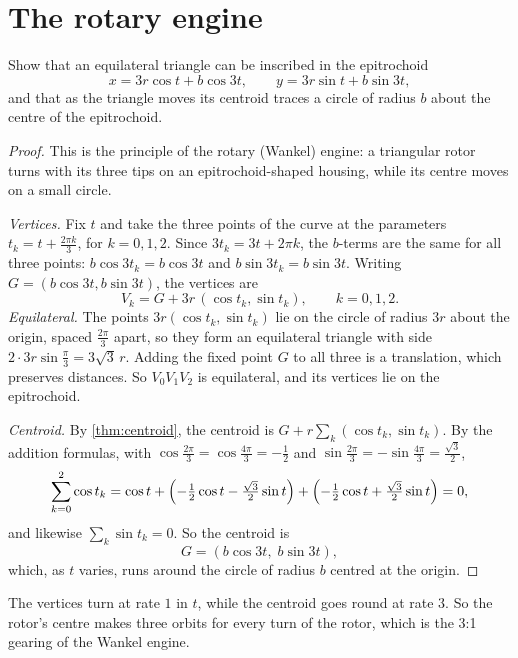 \section{The rotary engine}\label{sec:rotary-engine}



\begin{exercise}\label{ex:epitrochoid}
  Show that an equilateral triangle can be inscribed in the epitrochoid
  \[
    x = 3r\cos t + b\cos 3t, \qquad y = 3r\sin t + b\sin 3t,
  \]
  and that as the triangle moves its centroid traces a circle of radius $b$
  about the centre of the epitrochoid.
\end{exercise}

\begin{proof}
  This is the principle of the rotary (Wankel) engine: a triangular rotor
  turns with its three tips on an epitrochoid-shaped housing, while its
  centre moves on a small circle.

  \emph{Vertices.} Fix $t$ and take the three points of the curve at the
  parameters $t_k = t + \frac{2\pi k}{3}$, for $k = 0, 1, 2$. Since
  $3t_k = 3t + 2\pi k$, the $b$-terms are the same for all three points:
  $b\cos 3t_k = b\cos 3t$ and $b\sin 3t_k = b\sin 3t$. Writing
  $G = (b\cos 3t, b\sin 3t)$, the vertices are
  \[
    V_k = G + 3r\,(\cos t_k, \sin t_k), \qquad k = 0, 1, 2.
  \]
  \emph{Equilateral.} The points $3r(\cos t_k, \sin t_k)$ lie on the circle
  of radius $3r$ about the origin, spaced $\frac{2\pi}{3}$ apart, so they form
  an equilateral triangle with side $2 \cdot 3r \sin\frac{\pi}{3} = 3\sqrt3\,r$.
  Adding the fixed point $G$ to all three is a translation, which preserves
  distances. So $V_0V_1V_2$ is equilateral, and its vertices lie on the
  epitrochoid.

  \emph{Centroid.} By \cref{thm:centroid}, the centroid is
  $G + r\sum_k (\cos t_k, \sin t_k)$. By the addition formulas, with
  $\cos\frac{2\pi}{3} = \cos\frac{4\pi}{3} = -\frac12$ and
  $\sin\frac{2\pi}{3} = -\sin\frac{4\pi}{3} = \frac{\sqrt3}{2}$,
  \[
    \sum_{k=0}^{2} \cos t_k
    = \cos t
      + \Bigl(-\tfrac12\cos t - \tfrac{\sqrt3}{2}\sin t\Bigr)
      + \Bigl(-\tfrac12\cos t + \tfrac{\sqrt3}{2}\sin t\Bigr) = 0,
  \]
  and likewise $\sum_k \sin t_k = 0$. So the centroid is
  \[
    G = (b\cos 3t,\; b\sin 3t),
  \]
  which, as $t$ varies, runs around the circle of radius $b$ centred at the
  origin.
\end{proof}

\begin{remark}
  The vertices turn at rate $1$ in $t$, while the centroid goes round at
  rate $3$. So the rotor's centre makes three orbits for every turn of the
  rotor, which is the 3:1 gearing of the Wankel engine.
\end{remark}
